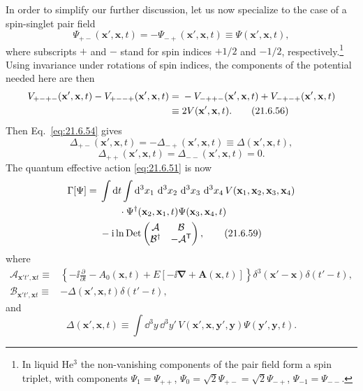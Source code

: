 In order to simplify our further discussion, let us now specialize to the case of a spin-singlet pair field
\begin{equation}
\Psi_{+-}(\mathbf x',\mathbf x,t)
=-\Psi_{-+}(\mathbf x',\mathbf x,t)
\equiv\Psi(\mathbf x',\mathbf x,t),
\tag{21.6.55}\label{eq:21.6.55}
\end{equation}
where subscripts $+$ and $-$ stand for spin indices $+1/2$ and $-1/2$, respectively.\footnote{In liquid He$^3$ the non-vanishing components of the pair field form a spin triplet, with components $\Psi_1=\Psi_{++}$, $\Psi_0=\sqrt2\Psi_{+-}=\sqrt2\Psi_{-+}$, $\Psi_{-1}=\Psi_{--}$.} Using invariance under rotations of spin indices, the components of the potential needed here are then
\begin{align}
V_{+-+-}(\mathbf x',\mathbf x,t)
-V_{+--+}(\mathbf x',\mathbf x,t)
={}&-V_{-++-}(\mathbf x',\mathbf x,t)
+V_{-+-+}(\mathbf x',\mathbf x,t)
\notag\\
\equiv{}&2V(\mathbf x',\mathbf x,t).
\tag{21.6.56}\label{eq:21.6.56}
\end{align}
Then Eq.~\eqref{eq:21.6.54} gives
\begin{equation}
\Delta_{+-}(\mathbf x',\mathbf x,t)
=-\Delta_{-+}(\mathbf x',\mathbf x,t)
\equiv\Delta(\mathbf x',\mathbf x,t),
\tag{21.6.57}\label{eq:21.6.57}
\end{equation}
\begin{equation}
\Delta_{++}(\mathbf x',\mathbf x,t)
=\Delta_{--}(\mathbf x',\mathbf x,t)=0.
\tag{21.6.58}\label{eq:21.6.58}
\end{equation}
The quantum effective action \eqref{eq:21.6.51} is now
\begin{align}
\Gamma[\Psi]
={}&\int \mathop{}\!\mathrm{d} t\int \mathop{}\!\mathrm{d}^3x_1\,\mathop{}\!\mathrm{d}^3x_2\,\mathop{}\!\mathrm{d}^3x_3\,\mathop{}\!\mathrm{d}^3x_4\,
V(\mathbf x_1,\mathbf x_2,\mathbf x_3,\mathbf x_4)
\notag\\
&\qquad\cdot
\Psi^\dagger(\mathbf x_2,\mathbf x_1,t)
\Psi(\mathbf x_3,\mathbf x_4,t)
\notag\\
&-\mathrm{i}\ln\operatorname{Det}
\begin{pmatrix}
\mathcal A&\mathcal B\\
\mathcal B^\dagger&-\mathcal A^{\mathsf T}
\end{pmatrix},
\tag{21.6.59}\label{eq:21.6.59}
\end{align}
where
\begin{align}
\mathcal A_{\mathbf x't',\mathbf xt}
\equiv{}&
\left\{
-\ii\frac{\partial}{\partial t}-A_0(\mathbf x,t)
+E[-\ii\boldsymbol\nabla+\mathbf A(\mathbf x,t)]
\right\}
\delta^3(\mathbf x'-\mathbf x)\delta(t'-t),
\tag{21.6.60}\label{eq:21.6.60}\\
\mathcal B_{\mathbf x't',\mathbf xt}
\equiv{}&-\Delta(\mathbf x',\mathbf x,t)\delta(t'-t),
\tag{21.6.61}\label{eq:21.6.61}
\end{align}
and
\begin{equation}
\Delta(\mathbf x',\mathbf x,t)
\equiv\int \dd^3y\,\dd^3y'\,
V(\mathbf x',\mathbf x,\mathbf y',\mathbf y)
\Psi(\mathbf y',\mathbf y,t).
\tag{21.6.62}\label{eq:21.6.62}
\end{equation}

